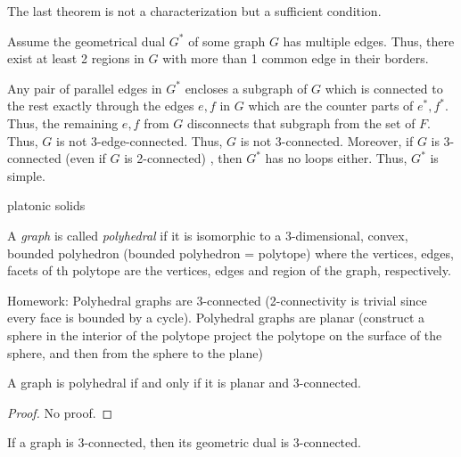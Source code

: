 \documentclass[aagt.tex]{subfiles}
\begin{document}

The last theorem is not a characterization but a sufficient condition.

Assume the geometrical dual $G^\ast$ of some graph $G$ has multiple edges. Thus, there exist at least 2 regions in $G$ with more than 1 common edge in their borders.

Any pair of parallel edges in $G^\ast$ encloses a subgraph of $G$ which is connected to the rest exactly through the edges $e,f$ in $G$ which are the counter parts of $e^\ast,f^\ast$.
Thus, the remaining $e,f$ from $G$ disconnects that subgraph from the set of $F$.
Thus, $G$ is not 3-edge-connected. Thus, $G$ is not 3-connected.
Moreover, if $G$ is 3-connected (even if $G$ is 2-connected) , then $G^\ast$ has no loops either.
Thus, $G^\ast$ is simple.

\begin{ex}
  platonic solids
\end{ex}

\begin{defi*}
  A \emph{graph} is called \emph{polyhedral} if it is isomorphic to a 3-dimensional, convex, bounded polyhedron (bounded polyhedron = polytope) where the vertices, edges, facets of th polytope are the vertices, edges and region of the graph, respectively.
\end{defi*}

Homework: Polyhedral graphs are 3-connected (2-connectivity is trivial since every face is bounded by a cycle).
Polyhedral graphs are planar (construct a sphere in the interior of the polytope project the polytope on the surface of the sphere, and then from the sphere to the plane)

\begin{theorem}[4.12 Steinitz 1922]
  A graph is polyhedral if and only if it is planar and 3-connected.
\end{theorem}

\begin{proof}
  No proof.
\end{proof}

\begin{prop}
  If a graph is 3-connected, then its geometric dual is 3-connected.
\end{prop}
\end{document}

